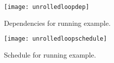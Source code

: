 






\begin{figure}[h]
\centering
\begin{minipage}{0.70\textwidth}
\texttt{[image: unrolledloopdep]}
\end{minipage}
\caption{Dependencies for running example. %
}
\label{fig:unrolledloopdep}  
\end{figure}


\begin{figure}[h]
\centering
\begin{minipage}{\textwidth}
\texttt{[image: unrolledloopschedule]}
\end{minipage}
\caption{Schedule for running example. %
}
\label{fig:unrolledloopschedule}  
\end{figure}
